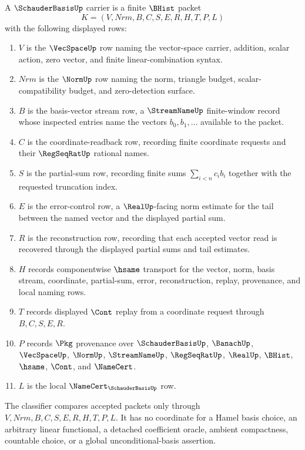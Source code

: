 \begin{definition}
\label{def:schauder-basis-carrier}
A $\SchauderBasisUp$ carrier is a finite $\BHist$ packet
$$
K=(V,Nrm,B,C,S,E,R,H,T,P,L)
$$
with the following displayed rows:
\begin{enumerate}
\item $V$ is the $\VecSpaceUp$ row naming the vector-space carrier, addition, scalar action, zero vector, and finite linear-combination syntax.
\item $Nrm$ is the $\NormUp$ row naming the norm, triangle budget, scalar-compatibility budget, and zero-detection surface.
\item $B$ is the basis-vector stream row, a $\StreamNameUp$ finite-window record whose inspected entries name the vectors $b_0,b_1,\ldots$ available to the packet.
\item $C$ is the coordinate-readback row, recording finite coordinate requests and their $\RegSeqRatUp$ rational names.
\item $S$ is the partial-sum row, recording finite sums $\sum_{i<n} c_i b_i$ together with the requested truncation index.
\item $E$ is the error-control row, a $\RealUp$-facing norm estimate for the tail between the named vector and the displayed partial sum.
\item $R$ is the reconstruction row, recording that each accepted vector read is recovered through the displayed partial sums and tail estimates.
\item $H$ records componentwise $\hsame$ transport for the vector, norm, basis stream, coordinate, partial-sum, error, reconstruction, replay, provenance, and local naming rows.
\item $T$ records displayed $\Cont$ replay from a coordinate request through $B,C,S,E,R$.
\item $P$ records $\Pkg$ provenance over $\SchauderBasisUp$, $\BanachUp$, $\VecSpaceUp$, $\NormUp$, $\StreamNameUp$, $\RegSeqRatUp$, $\RealUp$, $\BHist$, $\hsame$, $\Cont$, and $\NameCert$.
\item $L$ is the local $\NameCert_{\SchauderBasisUp}$ row.
\end{enumerate}
The classifier compares accepted packets only through $V,Nrm,B,C,S,E,R,H,T,P,L$. It has no coordinate for a Hamel basis choice, an arbitrary linear functional, a detached coefficient oracle, ambient compactness, countable choice, or a global unconditional-basis assertion.
\end{definition}

